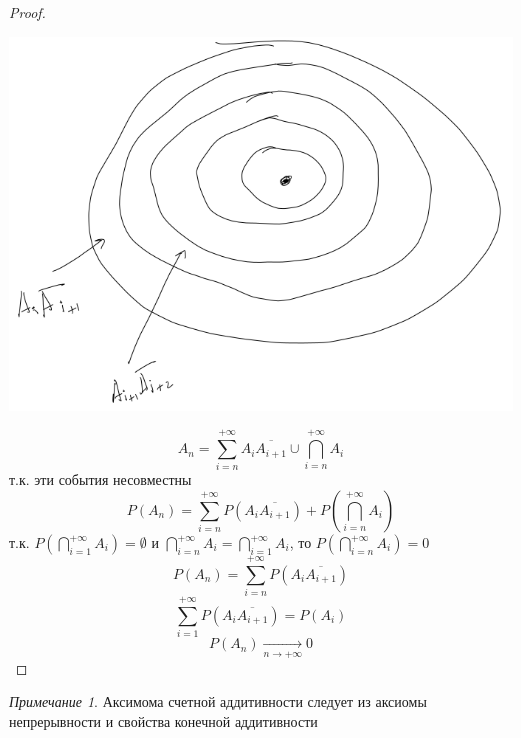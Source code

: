 \documentclass[english]{article}
\theoremstyle{plain}
\theoremstyle{remark}
\newtheorem*{remark}{Примечание}
\theoremstyle{definition}
\begin{document}
\begin{proof}
\-
\begin{center}
\includegraphics[scale=0.3]{2_1.png}
\end{center}
\[ A_n = \sum_{i = n}^{+ \infty} A_i\overline{A_{i + 1}} \cup \bigcap_{i = n}^{+ \infty}A_i \]
т.к. эти события несовместны
\[ P(A_n) = \sum_{i = n}^{+ \infty}P(A_i\overline{A_{i + 1}}) + P(\bigcap_{i = n}^{+\infty} A_i) \]
т.к. \(P(\bigcap_{i = 1}^{ + \infty} A_i) = \emptyset\) и \(\bigcap_{i = n}^{ +\infty}A_i = \bigcap_{i = 1}^{ + \infty}A_i\), то \(P(\bigcap_{i = n}^{ + \infty} A_i) = 0\) \\
\[ P(A_n) = \sum_{i = n}^{ + \infty} P(A_i \overline{A_{i + 1}}) \]
\[ \sum_{i = 1}^{ + \infty}P(A_i\overline{A_{i + 1}}) = P(A_i) \]
\[ P(A_n) \xrightarrow[n \to + \infty]{} 0 \]
\end{proof}
\begin{remark}
Аксимома счетной аддитивности следует из аксиомы непрерывности и свойства конечной аддитивности
\end{remark}
\end{document}
